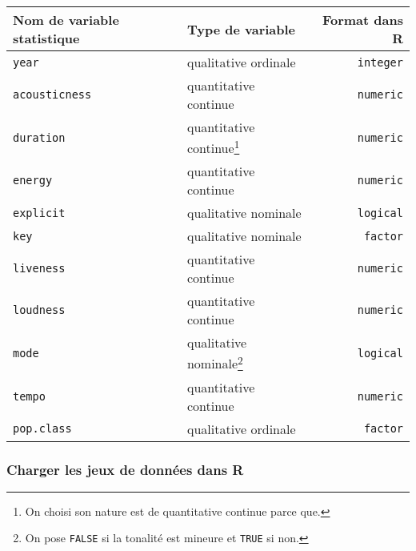 \documentclass[
  12pt,
]{article}
\begin{document}
\begin{longtable}[]{@{}llr@{}}
\toprule
Nom de variable statistique & Type de variable & Format dans R \\
\midrule
\endhead
\texttt{year} & qualitative ordinale & \texttt{integer} \\
\texttt{acousticness} & quantitative continue & \texttt{numeric} \\
\texttt{duration} & quantitative continue\footnote{On choisi son nature
  est de quantitative continue parce que.} & \texttt{numeric} \\
\texttt{energy} & quantitative continue & \texttt{numeric} \\
\texttt{explicit} & qualitative nominale & \texttt{logical} \\
\texttt{key} & qualitative nominale & \texttt{factor} \\
\texttt{liveness} & quantitative continue & \texttt{numeric} \\
\texttt{loudness} & quantitative continue & \texttt{numeric} \\
\texttt{mode} & qualitative nominale\footnote{On pose \texttt{FALSE} si
  la tonalité est mineure et \texttt{TRUE} si non.} &
\texttt{logical} \\
\texttt{tempo} & quantitative continue & \texttt{numeric} \\
\texttt{pop.class} & qualitative ordinale & \texttt{factor} \\
\bottomrule
\end{longtable}

\hypertarget{charger-les-jeux-de-donnuxe9es-dans-r}{%
\subsubsection{Charger les jeux de données dans
R}\label{charger-les-jeux-de-donnuxe9es-dans-r}}
\end{document}
